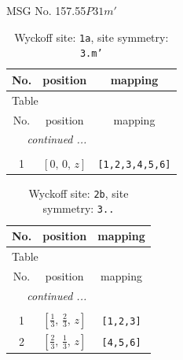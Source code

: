 \documentclass[fleqn,8pt]{jsarticle}
\begin{document}
\setcounter{MaxMatrixCols}{32}

\renewcommand{\tablename}{Table~}
\renewcommand{\figurename}{Figure~}
\begin{center}
\LARGE
MSG No. 157.55\quad$P31m'$
\end{center}
\renewcommand{\arraystretch}{1.2}
\begin{longtable}{ccc}
\caption{Wyckoff site: {\tt 1a}, site symmetry: {\tt 3.m'}}
 \\
 \hline \hline
No. & position & mapping \\ \hline \endfirsthead

\multicolumn{2}{l}{\tablename\ \thetable{}} \\
 \hline \hline
No. & position & mapping \\ \hline \endhead

 \hline \hline
\multicolumn{2}{r}{\footnotesize\it continued ...} \\ \endfoot

 \hline \hline
\multicolumn{2}{r}{} \\ \endlastfoot

1 & $\left[ 0,\, 0,\, z \right]$ & {\tt [1,2,3,4,5,6]} \\
\end{longtable}
\renewcommand{\arraystretch}{1.2}
\begin{longtable}{ccc}
\caption{Wyckoff site: {\tt 2b}, site symmetry: {\tt 3..}}
 \\
 \hline \hline
No. & position & mapping \\ \hline \endfirsthead

\multicolumn{2}{l}{\tablename\ \thetable{}} \\
 \hline \hline
No. & position & mapping \\ \hline \endhead

 \hline \hline
\multicolumn{2}{r}{\footnotesize\it continued ...} \\ \endfoot

 \hline \hline
\multicolumn{2}{r}{} \\ \endlastfoot

1 & $\left[ \frac{1}{3},\, \frac{2}{3},\, z \right]$ & {\tt [1,2,3]} \\ \hline
2 & $\left[ \frac{2}{3},\, \frac{1}{3},\, z \right]$ & {\tt [4,5,6]} \\
\end{longtable}
\renewcommand{\arraystretch}{1.2}
\end{document}
